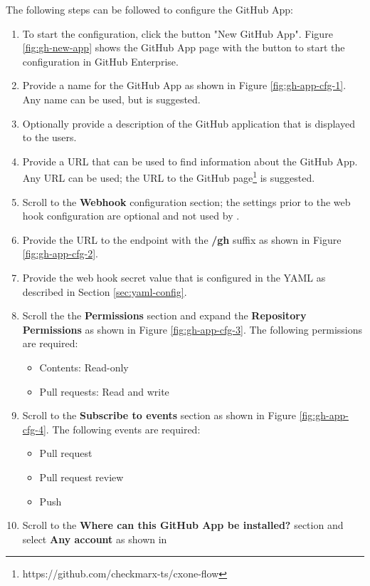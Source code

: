 The following steps can be followed to configure the \cxoneflow GitHub App:

\begin{enumerate}
    \item To start the configuration, click the button "New GitHub App". Figure \ref{fig:gh-new-app} shows
    the GitHub App page with the button to start the configuration in GitHub Enterprise.
    \item Provide a name for the GitHub App as shown in Figure \ref{fig:gh-app-cfg-1}.  Any name
    can be used, but \cxoneflow is suggested.
    \item Optionally provide a description of the GitHub application that is displayed to the users.
    \item Provide a URL that can be used to find information about the \cxoneflow GitHub App.  Any URL
    can be used; the URL to the \cxoneflow GitHub page\footnote{https://github.com/checkmarx-ts/cxone-flow}
    is suggested.
    \item Scroll to the \textbf{Webhook} configuration section; the settings prior to the web hook configuration
    are optional and not used by \cxoneflow.
    \item Provide the URL to the \cxoneflow endpoint with the \textbf{/gh} suffix as shown in Figure \ref{fig:gh-app-cfg-2}.
    \item Provide the web hook secret value that is configured in the \cxoneflow YAML as described in Section \ref{sec:yaml-config}.
    \item Scroll the the \textbf{Permissions} section and expand the \textbf{Repository Permissions} as shown in
    Figure \ref{fig:gh-app-cfg-3}.  The following permissions are required:
    \begin{itemize}
        \item Contents: Read-only
        \item Pull requests: Read and write
    \end{itemize}
    \item Scroll to the \textbf{Subscribe to events} section as shown in Figure \ref{fig:gh-app-cfg-4}.  The following events are required:
    \begin{itemize}
        \item Pull request
        \item Pull request review
        \item Push
    \end{itemize}
    \item Scroll to the \textbf{Where can this GitHub App be installed?} section and select \textbf{Any account} as shown in

\end{enumerate}

